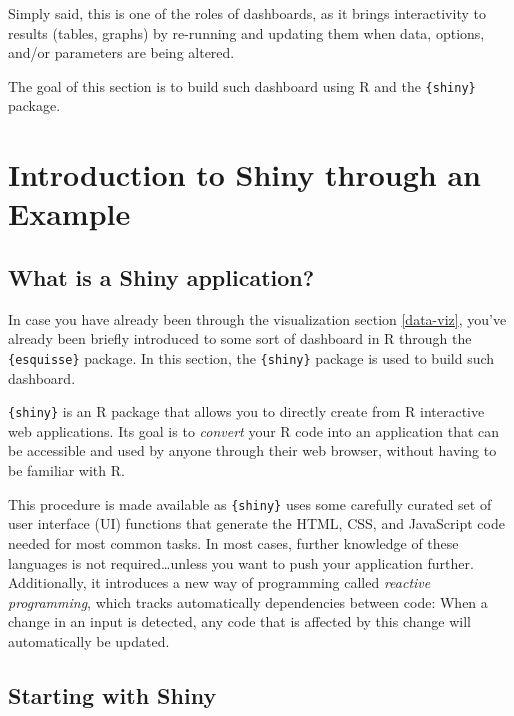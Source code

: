 \documentclass[
]{krantz}
\begin{document}
Simply said, this is one of the roles of dashboards, as it brings interactivity to results (tables, graphs) by re-running and updating them when data, options, and/or parameters are being altered.

The goal of this section is to build such dashboard using R and the \texttt{\{shiny\}} package.

\hypertarget{introduction-to-shiny-through-an-example}{%
\section{Introduction to Shiny through an Example}\label{introduction-to-shiny-through-an-example}}

\hypertarget{what-is-a-shiny-application}{%
\subsection{What is a Shiny application?}\label{what-is-a-shiny-application}}

In case you have already been through the visualization section \ref{data-viz}, you've already been briefly introduced to some sort of dashboard in R through the \texttt{\{esquisse\}} package. In this section, the \texttt{\{shiny\}} package is used to build such dashboard.

\texttt{\{shiny\}} is an R package that allows you to directly create from R interactive web applications. Its goal is to \emph{convert} your R code into an application that can be accessible and used by anyone through their web browser, without having to be familiar with R.

This procedure is made available as \texttt{\{shiny\}} uses some carefully curated set of user interface (UI) functions that generate the HTML, CSS, and JavaScript code needed for most common tasks. In most cases, further knowledge of these languages is not required\ldots unless you want to push your application further. Additionally, it introduces a new way of programming called \emph{reactive programming}, which tracks automatically dependencies between code: When a change in an input is detected, any code that is affected by this change will automatically be updated.

\hypertarget{starting-with-shiny}{%
\subsection{Starting with Shiny}\label{starting-with-shiny}}
\end{document}
